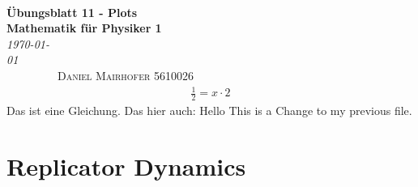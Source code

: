 \documentclass[10pt]{article}
\begin{document}
{\noindent\Huge\bf  \\[0.5\baselineskip] {\selectfont  Übungsblatt 11 - Plots}         }\\[2\baselineskip] %
{ {\bf {}\selectfont Mathematik für Physiker 1}\\ {\textit{\selectfont \today   }}}~~~~~~~~~~~~~~~~~~~~~~~~~~~~~~~~~~~~~~~~~~~~~~~~~~~~~~~~~~~~~~~~~~~~~~~~~~~~~\
{\textsc{Daniel Mairhofer 5610026}}%
\\[1.4\baselineskip] 
    
\begin{align}
                \frac 12 = x \cdot 2
\end{align}
Das ist eine Gleichung.
Das hier auch:
Hello
This is a Change to my previous file.
\section{Replicator Dynamics}
\end{document}
